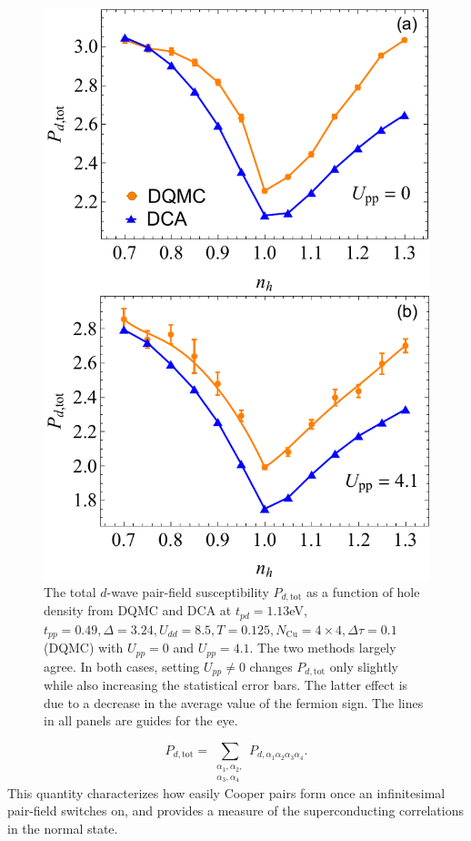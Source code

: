 \documentclass[reprint,nofootinbib,nobibnotes,amsmath,amssymb,aps,prb,floatfix]{revtex4-1}
\newcommand{\beq}{\begin{equation}}
\newcommand{\eeq}{\end{equation}}
\begin{document}
\begin{figure}[t!]
\centering
\includegraphics[width=0.8\linewidth]{./Figures/PdvaryUpp.pdf}
\caption{The total $d$-wave pair-field susceptibility $P_{d,\text{tot}}$ as a function of hole density from DQMC and DCA at $t_{pd}=1.13$eV, $t_{pp}=0.49, \Delta=3.24, U_{dd}=8.5, T=0.125, N_{\textrm{Cu}}=4\times 4, \Delta\tau=0.1$ (DQMC) with $U_{pp}=0$ and $U_{pp}=4.1$. The two methods largely agree. In both cases, 
setting $U_{pp}\ne 0$ changes $P_{d,\text{tot}}$ only slightly while also increasing the statistical error bars. The latter effect 
is due to a decrease in the average value of the fermion sign. The lines in all panels are guides for the eye.
}
\label{Upp}
\end{figure}

\beq
P_{d,\text{tot}}=\sum_{\substack{\alpha_1,\alpha_2,\\\alpha_3,\alpha_4}} P_{d,\alpha_1\alpha_2\alpha_3\alpha_4}.
\eeq
This quantity characterizes how easily Cooper pairs form once an infinitesimal pair-field switches on, and provides a measure of the superconducting correlations in the normal state.
\end{document}
